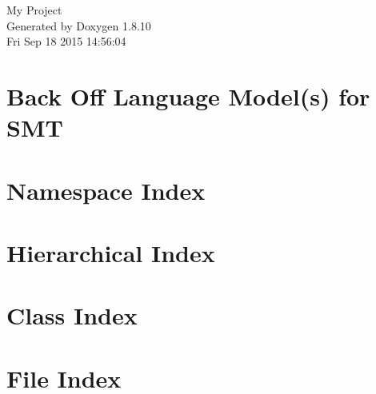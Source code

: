 \documentclass[twoside]{book}
\newcommand{\+}{\discretionary{\mbox{\scriptsize$\hookleftarrow$}}{}{}}
\newcommand{\clearemptydoublepage}{%
  \newpage{\pagestyle{empty}\cleardoublepage}%
}
\begin{document}
\hypersetup{pageanchor=false,
             bookmarks=true,
             bookmarksnumbered=true,
             pdfencoding=unicode
            }
\begin{titlepage}
\vspace*{7cm}
\begin{center}%
{\Large My Project }\\
\vspace*{1cm}
{\large Generated by Doxygen 1.8.10}\\
\vspace*{0.5cm}
{\small Fri Sep 18 2015 14:56:04}\\
\end{center}
\end{titlepage}
\clearemptydoublepage
\tableofcontents
\clearemptydoublepage
{}
\hypersetup{pageanchor=true}

\chapter{Back Off Language Model(s) for S\+M\+T}
\label{md__r_e_a_d_m_e}
\hypertarget{md__r_e_a_d_m_e}{}

\chapter{Namespace Index}

\chapter{Hierarchical Index}

\chapter{Class Index}

\chapter{File Index}

\end{document}
